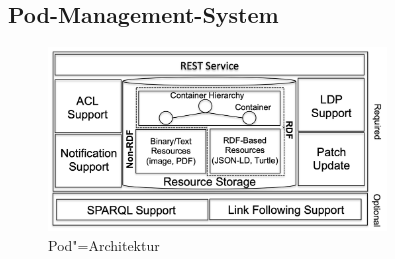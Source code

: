 \subsection{Pod-Management-System}

\begin{figure}
    \centering
    \includegraphics[width=0.8\textwidth]{../shared/assets/sambra_pod_architecture.png}
    \caption{Pod"=Architektur~\cite{sambraSolidPlatformDecentralized2016}}
\end{figure}

